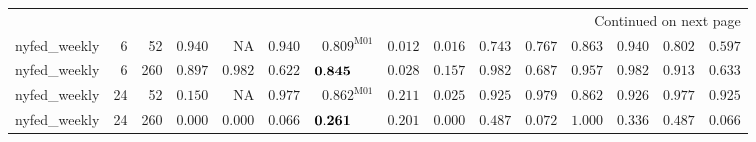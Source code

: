 \begin{longtable}{@{}lrrrrrrrrrrrrrr@{}}
\endhead
\midrule\multicolumn{15}{r}{Continued on next page}\\\endfoot
\bottomrule\endlastfoot
nyfed\_weekly & 6 & 52 & $\mathbf{0.940}$ & \textsc{NA} & $\mathbf{0.940}$ & $\mathbf{0.809}^{\mathrm{M01}}$ & $0.012$ & $0.016$ & $\mathbf{0.743}$ & $\mathbf{0.767}$ & $\mathbf{0.863}$ & $\mathbf{0.940}$ & $\mathbf{0.802}$ & $\mathbf{0.597}$ \\
nyfed\_weekly & 6 & 260 & $\mathbf{0.897}$ & $\mathbf{0.982}$ & $\mathbf{0.622}$ & $\mathbf{0.845}\hphantom{^{\mathrm{M00}}}$ & $0.028$ & $\mathbf{0.157}$ & $\mathbf{0.982}$ & $\mathbf{0.687}$ & $\mathbf{0.957}$ & $\mathbf{0.982}$ & $\mathbf{0.913}$ & $\mathbf{0.633}$ \\
nyfed\_weekly & 24 & 52 & $\mathbf{0.150}$ & \textsc{NA} & $\mathbf{0.977}$ & $\mathbf{0.862}^{\mathrm{M01}}$ & $\mathbf{0.211}$ & $0.025$ & $\mathbf{0.925}$ & $\mathbf{0.979}$ & $\mathbf{0.862}$ & $\mathbf{0.926}$ & $\mathbf{0.977}$ & $\mathbf{0.925}$ \\
nyfed\_weekly & 24 & 260 & $0.000$ & $0.000$ & $0.066$ & $\mathbf{0.261}\hphantom{^{\mathrm{M00}}}$ & $\mathbf{0.201}$ & $0.000$ & $\mathbf{0.487}$ & $0.072$ & $\mathbf{1.000}$ & $\mathbf{0.336}$ & $\mathbf{0.487}$ & $0.066$ \\
\end{longtable}

